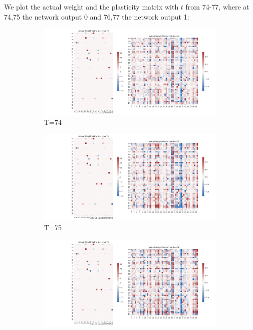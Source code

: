 \documentclass{article}
\begin{document}
We plot the actual weight and the plasticity matrix with $t$ from 74-77, where at 74,75 the network output 0 and 76,77 the network output 1:
\begin{figure}[h!]
  \centering
  \begin{minipage}[b]{0.45\linewidth}
    \centering
    \begin{subfigure}[b]{\linewidth}
      \includegraphics[width=\textwidth]{Actual_Weight_combined_74}
      \caption{T=74}
    \end{subfigure}
    \vfill
    \begin{subfigure}[b]{\linewidth}
      \includegraphics[width=\textwidth]{Actual_Weight_combined_75}
      \caption{T=75}
    \end{subfigure}
  \end{minipage}
  \hfill
  \begin{minipage}[b]{0.45\linewidth}
    \centering
    \begin{subfigure}[b]{\linewidth}
      \includegraphics[width=\textwidth]{Actual_Weight_combined_76}

\end{subfigure}
\end{minipage}
\end{figure}
\end{document}
